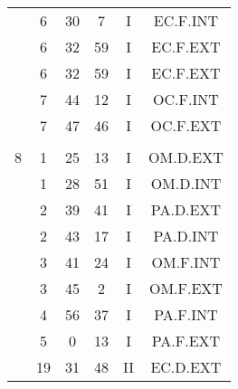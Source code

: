 \documentclass[12pt, a4paper]{article}
\begin{document}
\begin{multicols}{3}
{\begin{tabular}{c c c c c c}
	 	 	 	 & 6 & 30 & 7 & I & EC.F.INT\\%
	 	 	 	 & 6 & 32 & 59 & I & EC.F.EXT\\%
	 	 	 	 & 6 & 32 & 59 & I & EC.F.EXT\\%
	 	 	 	 & 7 & 44 & 12 & I & OC.F.INT\\%
	 	 	 	 & 7 & 47 & 46 & I & OC.F.EXT\\%
	 	 	 	 & & & & & \\%
	 	 	 	8 & 1 & 25 & 13 & I & OM.D.EXT\\%
	 	 	 	 & 1 & 28 & 51 & I & OM.D.INT\\%
	 	 	 	 & 2 & 39 & 41 & I & PA.D.EXT\\%
	 	 	 	 & 2 & 43 & 17 & I & PA.D.INT\\%
	 	 	 	 & 3 & 41 & 24 & I & OM.F.INT\\%
	 	 	 	 & 3 & 45 & 2 & I & OM.F.EXT\\%
	 	 	 	 & 4 & 56 & 37 & I & PA.F.INT\\%
	 	 	 	 & 5 & 0 & 13 & I & PA.F.EXT\\%
	 	 	 	 & 19 & 31 & 48 & II & EC.D.EXT\\%
	 	 \end{tabular}
 	}
\end{multicols}
\end{document}
